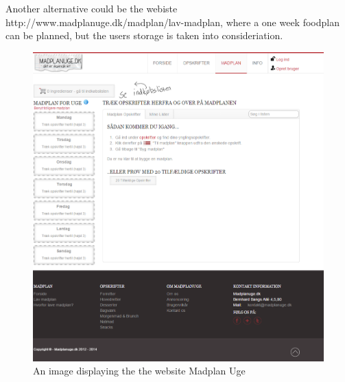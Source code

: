 
Another alternative could be the webiste http://www.madplanuge.dk/madplan/lav-madplan, where a one week foodplan can be planned, but the users storage is taken into consideriation.

\begin{figure}[H]
    \centering
    \includegraphics[width=\textwidth]{Grafik/madplanuge}
    \caption{An image displaying the the website Madplan Uge}
    \label{MadPlanUge}
\end{figure}


